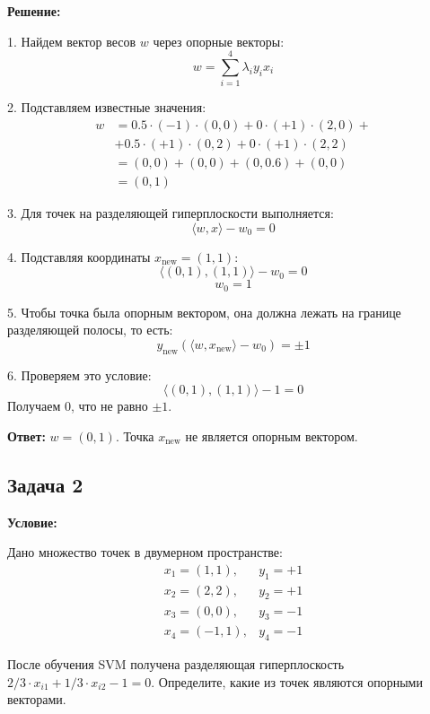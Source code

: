 \textbf{Решение:}
\par 1. Найдем вектор весов \(w\) через опорные векторы:
\begin{equation*}
    w = \sum_{i=1}^4 \lambda_i y_i x_i
\end{equation*}

\par 2. Подставляем известные значения:
\begin{align*}
    w &= 0.5 \cdot (-1) \cdot (0,0) + 0 \cdot (+1) \cdot (2,0) + \\
    &+ 0.5 \cdot (+1) \cdot (0,2) + 0 \cdot (+1) \cdot (2,2) \\
    &= (0,0) + (0,0) + (0,0.6) + (0,0) \\
    &= (0,1)
\end{align*}

\par 3. Для точек на разделяющей гиперплоскости выполняется:
\begin{equation*}
    \langle w,x \rangle - w_0 = 0
\end{equation*}

\par 4. Подставляя координаты \(x_{\text{new}} = (1,1)\):
\begin{equation*}
    \langle (0,1),(1,1) \rangle - w_0 = 0
\end{equation*}
\begin{equation*}
    w_0 = 1
\end{equation*}

\par 5. Чтобы точка была опорным вектором, она должна лежать на границе разделяющей полосы, то есть:
\begin{equation*}
    y_{\text{new}}(\langle w,x_{\text{new}} \rangle - w_0) = \pm 1
\end{equation*}

\par 6. Проверяем это условие:
\begin{equation*}
    \langle (0,1),(1,1) \rangle - 1 = 0
\end{equation*}
Получаем 0, что не равно $\pm1$.

\textbf{Ответ:} \(w = (0,1)\). Точка \(x_{\text{new}}\) не является опорным вектором.

\subsection{Задача 2}
\textbf{Условие:} 
\par Дано множество точек в двумерном пространстве:
\begin{equation*}
    \begin{array}{ll}
        x_1 = (1,1), & y_1 = +1 \\
        x_2 = (2,2), & y_2 = +1 \\
        x_3 = (0,0), & y_3 = -1 \\
        x_4 = (-1,1), & y_4 = -1
    \end{array}
\end{equation*}
\par После обучения SVM получена разделяющая гиперплоскость \(2/3 \cdot x_{i1} + 1/3 \cdot x_{i2} - 1 = 0\). Определите, какие из точек являются опорными векторами.

